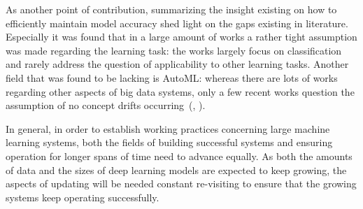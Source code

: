  
 As another point of contribution, summarizing the insight existing on how to efficiently maintain model accuracy shed light on the gaps existing in literature. Especially it was found that in a large amount of works a rather tight assumption was made regarding the learning task: the works largely focus on classification and rarely address the question of applicability to other learning tasks. Another field that was found to be lacking is AutoML: whereas there are lots of works regarding other aspects of big data systems, only a few recent works question the assumption of no concept drifts occurring~(\cite{celikAdaptationStrategiesAutomated2021}, \cite{madridAutoMLPresenceDrift2019}).
 
 
 
 In general, in order to establish working practices concerning large machine learning systems, both the fields of building successful systems and ensuring operation for longer spans of time need to advance equally. As both the amounts of data and the sizes of deep learning models are expected to keep growing, the aspects of updating will be needed constant re-visiting to ensure that the growing systems keep operating successfully.
